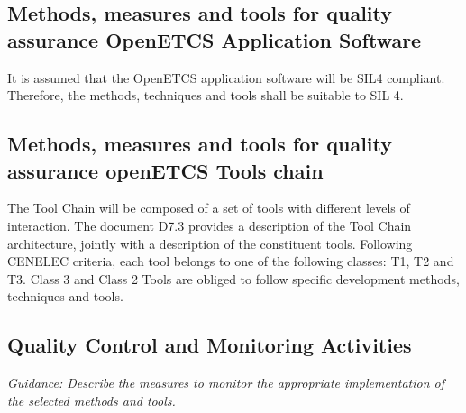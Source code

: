 \documentclass{template/openetcs_article}
\begin{document}
\subsection{Methods, measures and tools for quality assurance OpenETCS Application Software}

It is assumed that the OpenETCS application software will be \gls{SIL}4 compliant. Therefore, the methods, techniques and tools shall be suitable to \gls{SIL} 4. 





\subsection{Methods, measures and tools for quality assurance openETCS Tools chain}

The Tool Chain will be composed of a set of tools with different levels of interaction. The document D7.3 provides a description of the Tool Chain architecture, jointly with a description of the constituent tools.
Following CENELEC criteria, each tool belongs to one of the following classes: T1, T2 and T3. Class 3 and Class 2 Tools are obliged to follow specific development methods, techniques and tools. 


\subsection{Quality Control and Monitoring Activities}
\textit{Guidance: Describe the measures to monitor the appropriate implementation of the selected methods and tools.}


\end{document}
